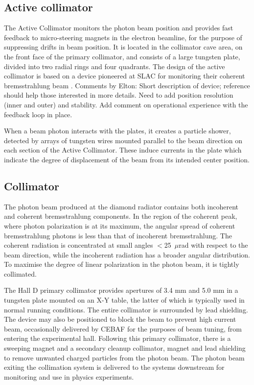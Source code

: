 \subsection{Active collimator \label{sec:coll}}
The Active Collimator monitors the photon beam position and provides fast feedback to micro-steering magnets in the electron beamline, for the purpose of suppressing drifts in beam position.
It is located in the collimator cave area, on the front face of the primary collimator, and consists of a large tungsten plate, divided into two radial rings and four quadrants. The design of the active collimator is based on a device pioneered at SLAC for monitoring their coherent bremsstrahlung beam \cite{Miller:1973yi}. 
{\color{red} Comments by Elton: Short description of device; reference should help those interested in more details. Need to add position resolution (inner and outer) and stability. Add comment on operational experience with the feedback loop in place.}

When a beam photon interacts with the plates, it creates a particle shower, detected by arrays of tungsten wires mounted parallel to the beam direction on each section of the Active Collimator.
These induce currents in the plate which indicate the degree of displacement of the beam from its intended center position.

\subsection{Collimator}
The photon beam produced at the diamond radiator contains both incoherent and coherent bremsstrahlung components.
In the region of the coherent peak, where photon polarization is at its maximum, the angular spread of coherent bremsstrahlung photons is less than that of incoherent bremsstrahlung.
The coherent radiation is concentrated at small angles $<$25~$\mu$rad with respect to the beam direction, while the incoherent radiation has a broader angular distribution.
To maximise the degree of linear polarization in the photon beam, it is tightly collimated.

The Hall D primary collimator provides apertures of 3.4 mm and 5.0 mm in a tungsten plate mounted on an X-Y table, the latter of which is typically used in normal \GX{} running conditions.
The entire collimator is surrounded by lead shielding.
The device may also be positioned to block the beam to prevent high current beam, occasionally delivered by CEBAF for the purposes of beam tuning, from entering the experimental hall. Following this primary collimator, there is a sweeping magnet and a secondary cleanup collimator, magnet and 
lead shielding to remove unwanted charged particles from the photon beam. The photon beam exiting the collimation system is delivered to the systems downstream for monitoring and use in physics experiments.

